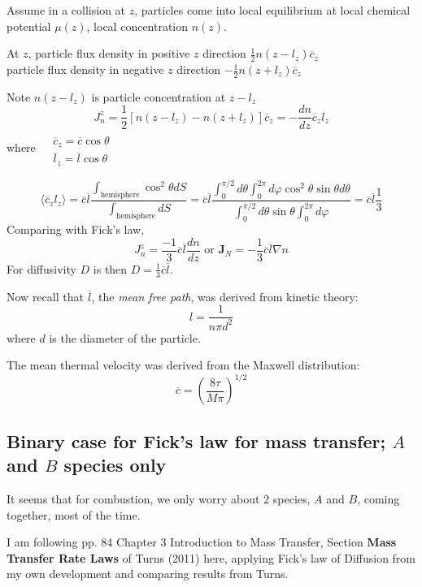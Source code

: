 \documentclass[10pt]{amsart}
\begin{document}
\begin{multicols*}{2}
Assume in a collision at $z$, particles come into local equilibrium at local chemical potential $\mu(z)$, local concentration $n(z)$.  

At $z$, particle flux density in positive $z$ direction \qquad $\frac{1}{2} n(z-l_z) \overline{c}_z$ \\
\phantom{At $z$, } particle flux density in negative $z$ direction \qquad $-\frac{1}{2} n(z+l_z) \overline{c}_z$

Note $n(z-l_z)$ is particle concentration at $z-l_z$
\[
J_n^z = \frac{1}{2} \left[ n(z-l_z) - n(z+l_z) \right] \overline{c}_z = -\frac{dn}{dz} \overline{c}_z l_z
\]
where $\begin{aligned} & \quad \\
  & \overline{c}_z = \overline{c} \cos{\theta}  \\
  & \overline{l}_z = \overline{l} \cos{\theta}  
\end{aligned}$

\[
\langle \overline{c}_z l_z \rangle = \overline{c} \overline{l} \frac{ \int_{\text{hemisphere} } \cos^2{\theta} dS }{ \int_{\text{hemisphere} } dS } = \overline{c}\overline{l} \frac{ \int_0^{\pi/2}d\theta \int_0^{2\pi } d\varphi \cos^2{\theta} \sin{\theta} d\theta }{ \int_0^{\pi/2} d\theta \sin{\theta} \int_0^{2\pi } d\varphi } = \overline{c} \overline{l} \frac{1}{3}
\]
Comparing with Fick's law, 
\[
J_n^z = \frac{-1}{3} \overline{c}\overline{l} \frac{dn}{dz} \text{ or } \mathbf{J}_N = -\frac{1}{3} \overline{c}\overline{l} \nabla n
\]
For diffusivity $D$ is then $D = \frac{1}{3} \overline{c}\overline{l}$.  

Now recall that $\overline{l}$, the \emph{mean free path}, was derived from kinetic theory:
\[
l = \frac{1}{n\pi d^2}
\]
where $d$ is the diameter of the particle.  

The mean thermal velocity was derived from the Maxwell distribution:
\[
\overline{c} = \left( \frac{ 8 \tau }{M \pi} \right)^{1/2}
\]

\subsection{Binary case for Fick's law for mass transfer; $A$ and $B$ species only}

It seems that for combustion, we only worry about 2 species, $A$ and $B$, coming together, most of the time.  

I am following pp. 84 Chapter 3 Introduction to Mass Transfer, Section \textbf{Mass Transfer Rate Laws} of Turns (2011) \cite{STurns2011} here, applying Fick's law of Diffusion from my own development and comparing results from Turns.


\end{multicols*}
\end{document}

